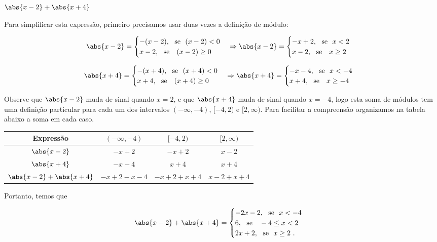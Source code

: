  \begin{exem}
  $\abs{x-2} + \abs{x+4}$ \label{eqmodulo}

 Para simplificar esta expressão, primeiro precisamos usar duas vezes a definição de módulo:

 \[ \abs{x-2} = \begin{cases}
      -(x-2), \ \ \text{se} \ \ (x-2)< 0 \\
      x-2, \ \ \text{se } \ \ (x-2) \geq 0
     \end{cases}
     \Rightarrow
     \abs{x-2} = \begin{cases}
      -x + 2, \ \ \text{se} \ \ x < 2 \\
      x-2, \ \ \text{se } \ \ x \geq 2
     \end{cases}
  \]

 \[ \abs{x+4} = \begin{cases}
      -(x+4), \ \ \text{se} \ \ (x+4)< 0 \\
      x+4, \ \ \text{se } \ \ (x+4) \geq 0
     \end{cases}
     \Rightarrow
     \abs{x+4} = \begin{cases}
      -x - 4, \ \ \text{se} \ \ x < -4 \\
      x + 4, \ \ \text{se } \ \ x \geq -4
     \end{cases}
  \]

  Observe que $\abs{x-2}$ muda de sinal quando $x=2$, e que $\abs{x+4}$ muda de sinal quando $x=-4$, logo esta soma de módulos tem uma definição particular para cada um dos intervalos $(-\infty, -4)$, $[-4, 2)$ e $[2, \infty)$. Para facilitar a compreensão organizamos na tabela abaixo a soma em cada caso.

   \begin{table}[H]
 \centering
 \begin{tabular}{|c|c|c|c|} \hline
 \rowcolor{cinza}
  Expressão & $(-\infty, -4)$ & $[-4, 2)$ & $[2, \infty)$  \\\hline
  $\abs{x-2}$ & $-x+2$ &  $-x+2$ & $x-2$ \\\hline
  $\abs{x+4}$ & $-x-4$ &  $x+4$ & $x+4$ \\\hline
  $\abs{x-2} + \abs{x+4}$ & $-x+2-x-4$ & $-x+2+x+4$ & $x-2+x+4$ \\\hline
 \end{tabular}
\end{table}

 Portanto, temos que

  \[ \abs{x-2} + \abs{x+4} = \begin{cases}
      -2x-2, \ \ \text{se} \ \ x < -4 \\
      6, \ \ \text{se } \ \ -4 \leq x < 2 \\
      2x + 2, \ \ \text{se} \ \ x \geq 2 \ .
     \end{cases}
  \]
 \end{exem}
 
